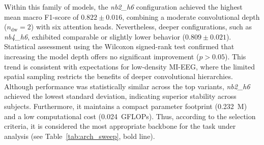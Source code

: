 \documentclass[a4paper,fleqn]{cas-dc}
\begin{document}
Within this family of models, the \textit{nb2\_h6} configuration achieved the highest mean macro F1-score of $0.822 \pm 0.016$, combining a moderate convolutional depth ($n_{\text{dw}}=2$) with six attention heads. Nevertheless, deeper configurations, such as \textit{nb4\_h6}, exhibited comparable or slightly lower behavior ($0.809 \pm 0.021$). Statistical assessment using the Wilcoxon signed-rank test confirmed that increasing the model depth offers no significant improvement ($p > 0.05$). This trend is consistent with expectations for low-density MI-EEG, where the limited spatial sampling restricts the benefits of deeper convolutional hierarchies. Although performance was statistically similar across the top variants, \textit{nb2\_h6} achieved the lowest standard deviation, indicating superior stability across subjects. Furthermore, it maintains a compact parameter footprint (0.232~M) and a low computational cost (0.024~GFLOPs). Thus, according to the selection criteria, it is considered the most appropriate backbone for the task under analysis (see Table~\ref{tab:arch_sweep}, bold line).
\end{document}

